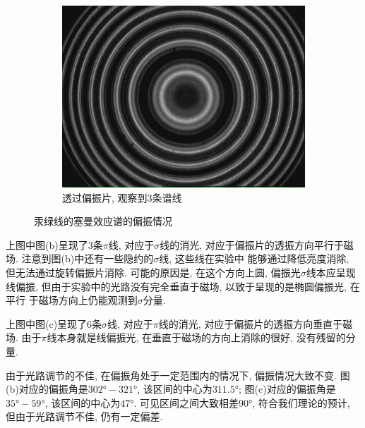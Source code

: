 \documentclass[12pt,a4paper]{article}
\begin{document}
\begin{figure}[H]
\begin{subfigure}[b]{0.3\textwidth}
      \includegraphics[width=\textwidth]{MultiRings-polorizeA.jpg}
      \caption{透过偏振片, 观察到3条谱线}
    \end{subfigure}
    \caption{汞绿线的塞曼效应谱的偏振情况}
  \end{figure}

上图中图(b)呈现了3条$\pi$线, 对应于$\sigma$线的消光, 对应于偏振片的透振方向平行于磁场. 注意到图(b)中还有一些隐约的$\sigma$线, 这些线在实验中
能够通过降低亮度消除, 但无法通过旋转偏振片消除. 可能的原因是, 在这个方向上圆, 偏振光$\sigma$线本应呈现线偏振, 但由于实验中的光路没有完全垂直于磁场, 以致于呈现的是椭圆偏振光, 在平行
于磁场方向上仍能观测到$\sigma$分量. 

上图中图(c)呈现了6条$\sigma$线, 对应于$\pi$线的消光, 对应于偏振片的透振方向垂直于磁场. 由于$\pi$线本身就是线偏振光, 在垂直于磁场的方向上消除的很好, 没有残留的分量. 

由于光路调节的不佳, 在偏振角处于一定范围内的情况下, 偏振情况大致不变. 图(b)对应的偏振角是$302°-321°$, 该区间的中心为$311.5°$; 图(c)对应的偏振角是$35°-59°$, 该区间的中心为$47°$. 可见区间之间大致相差90°, 
符合我们理论的预计, 但由于光路调节不佳, 仍有一定偏差. 
\end{document}
